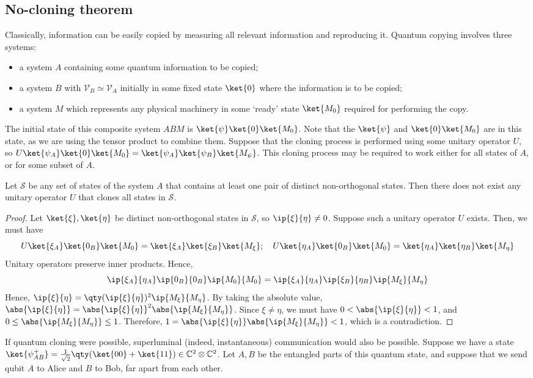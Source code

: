 \subsection{No-cloning theorem}
Classically, information can be easily copied by measuring all relevant information and reproducing it.
Quantum copying involves three systems:
\begin{itemize}
    \item a system $A$ containing some quantum information to be copied;
    \item a system $B$ with $\mathcal V_B \simeq \mathcal V_A$ initially in some fixed state $\ket{0}$ where the information is to be copied;
    \item a system $M$ which represents any physical machinery in some `ready' state $\ket{M_0}$ required for performing the copy.
\end{itemize}
The initial state of this composite system $ABM$ is $\ket{\psi} \ket{0} \ket{M_0}$.
Note that the $\ket{\psi}$ and $\ket{0}\ket{M_0}$ are  in this state, as we are using the tensor product to combine them.
Suppose that the cloning process is performed using some unitary operator $U$, so $U\ket{\psi_A}\ket{0}\ket{M_0} = \ket{\psi_A}\ket{\psi_B}\ket{M_\psi}$.
This cloning process may be required to work either for all states of $A$, or for some subset of $A$.
\begin{theorem}
    Let $\mathcal S$ be any set of states of the system $A$ that contains at least one pair of distinct non-orthogonal states.
    Then there does not exist any unitary operator $U$ that clones all states in $\mathcal S$.
\end{theorem}
\begin{proof}
    Let $\ket{\xi}, \ket{\eta}$ be distinct non-orthogonal states in $\mathcal S$, so $\ip{\xi}{\eta} \neq 0$.
    Suppose such a unitary operator $U$ exists.
    Then, we must have
    \[ U \ket{\xi_A}\ket{0_B}\ket{M_0} = \ket{\xi_A}\ket{\xi_B}\ket{M_\xi};\quad U \ket{\eta_A}\ket{0_B}\ket{M_0} = \ket{\eta_A}\ket{\eta_B}\ket{M_\eta} \]
    Unitary operators preserve inner products.
    Hence,
    \[ \ip{\xi_A}{\eta_A} \ip{0_B}{0_B} \ip{M_0}{M_0} = \ip{\xi_A}{\eta_A} \ip{\xi_B}{\eta_B} \ip{M_\xi}{M_\eta} \]
    Hence, $\ip{\xi}{\eta} = \qty(\ip{\xi}{\eta})^2 \ip{M_\xi}{M_\eta}$.
    By taking the absolute value, $\abs{\ip{\xi}{\eta}} = \abs{\ip{\xi}{\eta}}^2 \abs{\ip{M_\xi}{M_\eta}}$.
    Since $\xi \neq \eta$, we must have $0 < \abs{\ip{\xi}{\eta}} < 1$, and $0 \leq \abs{\ip{M_\xi}{M_\eta}} \leq 1$.
    Therefore, $1 = \abs{\ip{\xi}{\eta}} \abs{\ip{M_\xi}{M_\eta}} < 1$, which is a contradiction.
\end{proof}
If quantum cloning were possible, superluminal (indeed, instantaneous) communication would also be possible.
Suppose we have a state $\ket{\psi^+_{AB}} = \frac{1}{\sqrt{2}} \qty(\ket{00} + \ket{11}) \in \mathbb C^2 \otimes \mathbb C^2$.
Let $A, B$ be the entangled parts of this quantum state, and suppose that we send qubit $A$ to Alice and $B$ to Bob, far apart from each other.


